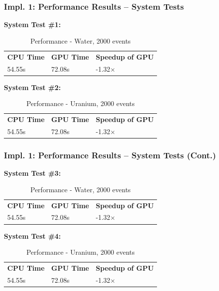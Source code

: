 \documentclass{beamer}
\begin{document}
\begin{frame}
\frametitle{Impl. 1: Performance Results -- System Tests}
\textbf{System Test \#1:}\\
\begin{table}
		\caption{Performance - Water, 2000 events}
		\begin{tabular}{lll}
		\bf CPU Time&\bf  GPU Time&\bf Speedup of GPU\\
		54.55s&72.08s&-1.32$\times$\\
		\end{tabular}
\end{table}
\textbf{System Test \#2:}\\
\begin{table}
		\caption{Performance - Uranium, 2000 events}
		\begin{tabular}{lll}
		\bf CPU Time&\bf  GPU Time&\bf Speedup of GPU\\
		54.55s&72.08s&-1.32$\times$\\
		\end{tabular}
\end{table}
\end{frame}

\begin{frame}
\frametitle{Impl. 1: Performance Results -- System Tests (Cont.)}
\textbf{System Test \#3:}\\
\begin{table}
		\caption{Performance - Water, 2000 events}
		\begin{tabular}{lll}
		\bf CPU Time&\bf  GPU Time&\bf Speedup of GPU\\
		54.55s&72.08s&-1.32$\times$\\
		\end{tabular}
\end{table}
\textbf{System Test \#4:}\\
\begin{table}
		\caption{Performance - Uranium, 2000 events}
		\begin{tabular}{lll}
		\bf CPU Time&\bf  GPU Time&\bf Speedup of GPU\\
		54.55s&72.08s&-1.32$\times$\\
		\end{tabular}
\end{table}
\end{frame}
\end{document}
